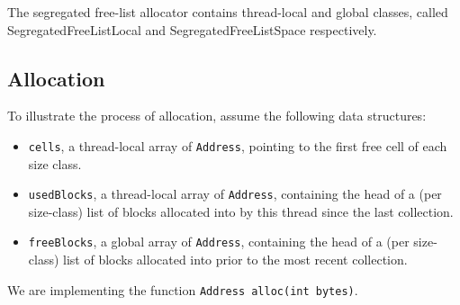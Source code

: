 The segregated free-list allocator contains thread-local and global classes,
called SegregatedFreeListLocal and SegregatedFreeListSpace respectively.  

\subsection{Allocation}

To illustrate the process of allocation, assume the following data structures:
\begin{itemize} %
  \item \lstinline|cells|, a thread-local array of \lstinline|Address|, pointing
  to the first free cell of each size class.
  \item \lstinline|usedBlocks|, a thread-local array of \lstinline|Address|,
  containing the head of a (per size-class) list of blocks allocated into by
  this thread since the last collection.
  \item \lstinline|freeBlocks|, a global array of \lstinline|Address|,
  containing the head of a (per size-class) list of blocks allocated into prior
  to the most recent collection.
\end{itemize}
We are implementing the function \lstinline|Address alloc(int bytes)|.
